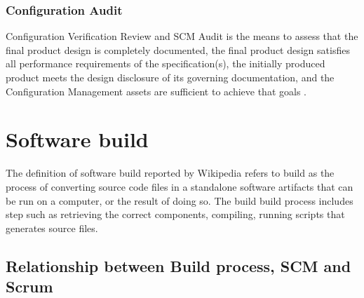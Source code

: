 \documentclass[../main.tex]{subfiles}
\begin{document}
\subsubsection{Configuration Audit}
Configuration Verification Review and SCM Audit is the means to assess that the final product design is completely documented, the final product design satisfies all performance requirements of the specification(s), the initially produced product meets the design disclosure of its governing documentation, and the Configuration Management assets are sufficient to achieve that goals \cite{ieestandard}.
\section{Software build}
The definition of software build reported by Wikipedia \cite{builddef} refers to build as the process of converting source code files in a standalone software artifacts that can be run on a computer, or the result of doing so. The build build process includes step such as retrieving the correct components, compiling, running scripts that generates source files.\\
\subsection{Relationship between Build process, SCM and Scrum}
\end{document}
